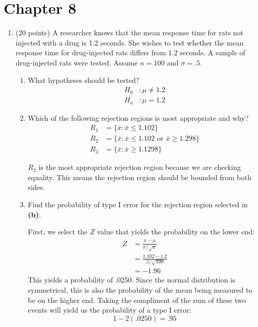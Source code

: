\documentclass[12pt, letter]{article}
\begin{document}
\section*{Chapter 8}

\begin{enumerate}
	\item (20 points) A researcher knows that the mean response time for rats not injected with a drug is 1.2 seconds. She wishes to test whether the mean response time for drug-injected rats differs from 1.2 seconds. A sample of drug-injected rats were tested.  Assume $n = 100$ and $\sigma = .5$.
	\begin{enumerate}
		\item What hypotheses should be tested?
		\begin{align*}
			H_{0}&: \mu \neq 1.2 \\
			H_{a}&: \mu = 1.2
		\end{align*}
		
		\item Which of the following rejection regions is most appropriate and why?
		\begin{align*}
			R_{1} &= \{\bar{x}:\bar{x} \le 1.102\} \\
			R_{2} &= \{\bar{x}:\bar{x} \le 1.102 \text{ or } \bar{x} \ge 1.298\} \\
			R_{3} &= \{\bar{x}:\bar{x} \ge 1.1298\}
		\end{align*}
		\begin{center}
			$\boxed{R_{2}}$ is the most appropriate rejection region because we are checking equality. This means the rejection region should be bounded from both sides.
		\end{center}
		
		\item Find the probability of type I error for the rejection region selected in \textbf{(b)}.
		\begin{center}
		First, we select the $Z$ value that yields the probability on the lower end:
			\begin{align*}
				Z &= \frac{\bar{x} - \mu}{\sigma/\sqrt{n}} \\
				&= \frac{1.102 - 1.2}{.5/\sqrt{100}} \\
				&= -1.96
			\end{align*}
			This yields a probability of .0250. Since the normal distribution is symmetrical, this is also the probability of the mean being measured to be on the higher end. Taking the compliment of the sum of these two events will yield us the probability of a type I error:
			$$1 - 2(.0250) = \boxed{.95}$$
		\end{center}
		

\end{enumerate}
\end{enumerate}
\end{document}
